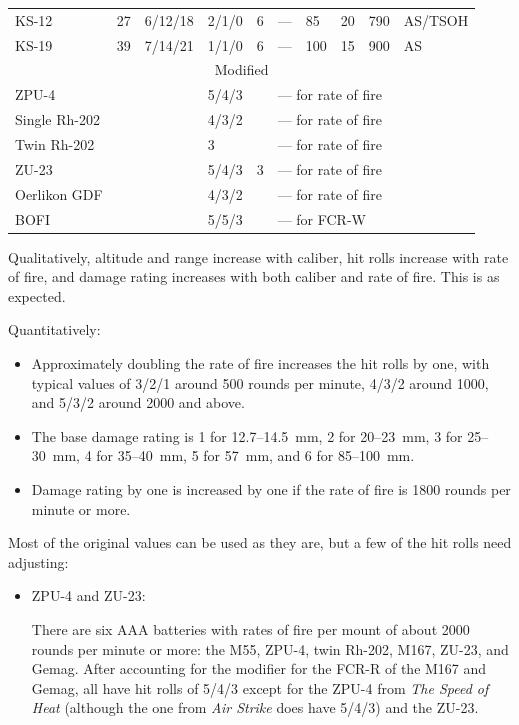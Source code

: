 \documentclass[10pt]{article}
\begin{document}
{\begin{center}
\begin{tabular}{lrlllllrrl}
            KS-12&27&6/12/18&2/1/0&6&---&85&20&790&AS/TSOH\\
            KS-19&39&7/14/21&1/1/0&6&---&100&15&900&AS\\
            \midrule
            \multicolumn{10}{c}{Modified}\\
            \midrule
            ZPU-4&&&5/4/3&&\multicolumn{5}{l}{--- for rate of fire}\\
            Single Rh-202&&&4/3/2&&\multicolumn{5}{l}{--- for rate of fire}\\
            Twin Rh-202&& &3 & &\multicolumn{5}{l}{--- for rate of fire}\\
            ZU-23&&&5/4/3&3&\multicolumn{5}{l}{--- for rate of fire}\\
            Oerlikon GDF&&&4/3/2&&\multicolumn{5}{l}{--- for rate of fire}\\
            BOFI&&&5/5/3&&\multicolumn{5}{l}{--- for FCR-W}\\
            \bottomrule
        \end{tabular}
        \medskip
    \end{center}

    Qualitatively, altitude and range increase with caliber, hit rolls increase with rate of fire, and damage rating increases with both caliber and rate of fire.
    This is as expected.

    Quantitatively:
    \begin{itemize}
        \item Approximately doubling the rate of fire increases the hit rolls by one, with typical values of 3/2/1 around 500 rounds per minute, 4/3/2 around 1000, and 5/3/2 around 2000 and above.
        \item The base damage rating is 1 for 12.7--14.5~mm, 2 for 20--23~mm, 3 for 25--30~mm, 4 for 35--40~mm, 5 for 57~mm, and 6 for 85--100~mm.
        \item Damage rating by one is increased by one if the rate of fire is 1800 rounds per minute or more.
    \end{itemize}

    Most of the original values can be used as they are, but a few of the hit rolls need adjusting:
    \begin{itemize}
        \item ZPU-4 and ZU-23:

            There are six AAA batteries with rates of fire per mount of about 2000 rounds per minute or more: the M55, ZPU-4, twin Rh-202, M167, ZU-23, and Gemag. After accounting for the  modifier for the FCR-R of the M167 and Gemag, all have hit rolls of 5/4/3 except for the ZPU-4 from \emph{The Speed of Heat} (although the one from \emph{Air Strike} does have 5/4/3) and the ZU-23.


\end{itemize}}
\end{document}
